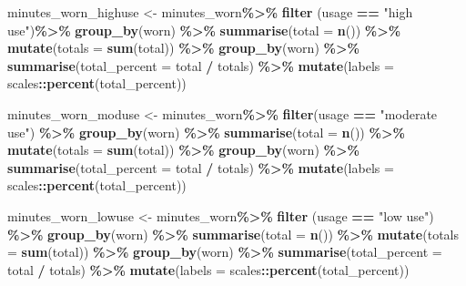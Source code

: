 \documentclass[
]{article}
\newenvironment{Shaded}{\begin{snugshade}}{\end{snugshade}}
\newcommand{\AttributeTok}[1]{\textcolor[rgb]{0.13,0.29,0.53}{#1}}
\newcommand{\FunctionTok}[1]{\textcolor[rgb]{0.13,0.29,0.53}{\textbf{#1}}}
\newcommand{\NormalTok}[1]{#1}
\newcommand{\OtherTok}[1]{\textcolor[rgb]{0.56,0.35,0.01}{#1}}
\newcommand{\SpecialCharTok}[1]{\textcolor[rgb]{0.81,0.36,0.00}{\textbf{#1}}}
\newcommand{\StringTok}[1]{\textcolor[rgb]{0.31,0.60,0.02}{#1}}
\begin{document}
\begin{Shaded}
\begin{Highlighting}[]
\NormalTok{minutes\_worn\_highuse }\OtherTok{\textless{}{-}}\NormalTok{ minutes\_worn}\SpecialCharTok{\%\textgreater{}\%}
  \FunctionTok{filter}\NormalTok{ (usage }\SpecialCharTok{==} \StringTok{"high use"}\NormalTok{)}\SpecialCharTok{\%\textgreater{}\%}
  \FunctionTok{group\_by}\NormalTok{(worn) }\SpecialCharTok{\%\textgreater{}\%}
  \FunctionTok{summarise}\NormalTok{(}\AttributeTok{total =} \FunctionTok{n}\NormalTok{()) }\SpecialCharTok{\%\textgreater{}\%}
  \FunctionTok{mutate}\NormalTok{(}\AttributeTok{totals =} \FunctionTok{sum}\NormalTok{(total)) }\SpecialCharTok{\%\textgreater{}\%}
  \FunctionTok{group\_by}\NormalTok{(worn) }\SpecialCharTok{\%\textgreater{}\%}
  \FunctionTok{summarise}\NormalTok{(}\AttributeTok{total\_percent =}\NormalTok{ total }\SpecialCharTok{/}\NormalTok{ totals) }\SpecialCharTok{\%\textgreater{}\%}
  \FunctionTok{mutate}\NormalTok{(}\AttributeTok{labels =}\NormalTok{ scales}\SpecialCharTok{::}\FunctionTok{percent}\NormalTok{(total\_percent))}

\NormalTok{minutes\_worn\_moduse }\OtherTok{\textless{}{-}}\NormalTok{ minutes\_worn}\SpecialCharTok{\%\textgreater{}\%}
  \FunctionTok{filter}\NormalTok{(usage }\SpecialCharTok{==} \StringTok{"moderate use"}\NormalTok{) }\SpecialCharTok{\%\textgreater{}\%}
  \FunctionTok{group\_by}\NormalTok{(worn) }\SpecialCharTok{\%\textgreater{}\%}
  \FunctionTok{summarise}\NormalTok{(}\AttributeTok{total =} \FunctionTok{n}\NormalTok{()) }\SpecialCharTok{\%\textgreater{}\%}
  \FunctionTok{mutate}\NormalTok{(}\AttributeTok{totals =} \FunctionTok{sum}\NormalTok{(total)) }\SpecialCharTok{\%\textgreater{}\%}
  \FunctionTok{group\_by}\NormalTok{(worn) }\SpecialCharTok{\%\textgreater{}\%}
  \FunctionTok{summarise}\NormalTok{(}\AttributeTok{total\_percent =}\NormalTok{ total }\SpecialCharTok{/}\NormalTok{ totals) }\SpecialCharTok{\%\textgreater{}\%}
  \FunctionTok{mutate}\NormalTok{(}\AttributeTok{labels =}\NormalTok{ scales}\SpecialCharTok{::}\FunctionTok{percent}\NormalTok{(total\_percent))}

\NormalTok{minutes\_worn\_lowuse }\OtherTok{\textless{}{-}}\NormalTok{ minutes\_worn}\SpecialCharTok{\%\textgreater{}\%}
  \FunctionTok{filter}\NormalTok{ (usage }\SpecialCharTok{==} \StringTok{"low use"}\NormalTok{) }\SpecialCharTok{\%\textgreater{}\%}
  \FunctionTok{group\_by}\NormalTok{(worn) }\SpecialCharTok{\%\textgreater{}\%}
  \FunctionTok{summarise}\NormalTok{(}\AttributeTok{total =} \FunctionTok{n}\NormalTok{()) }\SpecialCharTok{\%\textgreater{}\%}
  \FunctionTok{mutate}\NormalTok{(}\AttributeTok{totals =} \FunctionTok{sum}\NormalTok{(total)) }\SpecialCharTok{\%\textgreater{}\%}
  \FunctionTok{group\_by}\NormalTok{(worn) }\SpecialCharTok{\%\textgreater{}\%}
  \FunctionTok{summarise}\NormalTok{(}\AttributeTok{total\_percent =}\NormalTok{ total }\SpecialCharTok{/}\NormalTok{ totals) }\SpecialCharTok{\%\textgreater{}\%}
  \FunctionTok{mutate}\NormalTok{(}\AttributeTok{labels =}\NormalTok{ scales}\SpecialCharTok{::}\FunctionTok{percent}\NormalTok{(total\_percent))}


\end{Highlighting}
\end{Shaded}
\end{document}
